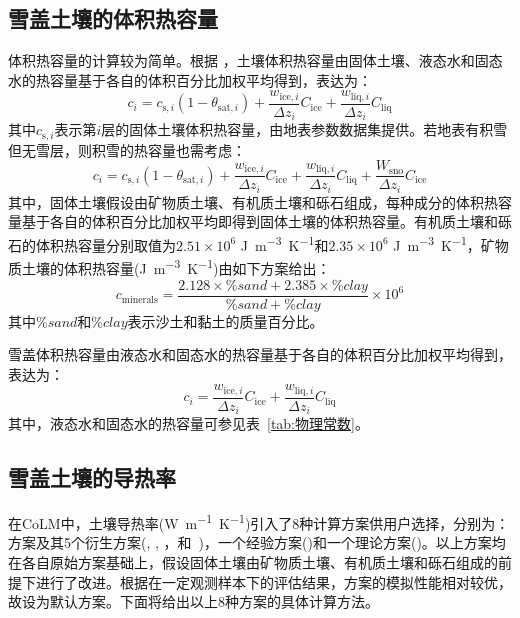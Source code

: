 \subsection{雪盖土壤的体积热容量}

体积热容量的计算较为简单。根据 \citet{de1963thermal}，土壤体积热容量由固体土壤、液态水和固态水的热容量基于各自的体积百分比加权平均得到，表达为：
\begin{equation}
  c_{i}=c_{\mathrm{s},i}\left(1-\theta_{\mathrm {sat},i}\right)+\frac{w_{\mathrm{ice},i}}{\Delta z_{i}} C_{\mathrm{ice}}+\frac{w_{\mathrm{liq},i}}{\Delta z_{i}} C_{\mathrm{liq}}
\end{equation}
其中$c_{\mathrm{s},i}$表示第$i$层的固体土壤体积热容量，由地表参数数据集提供。若地表有积雪但无雪层，则积雪的热容量也需考虑：
\begin{equation}
  c_{i}=c_{\mathrm{s},i}\left(1-\theta_{\mathrm {sat},i}\right)+\frac{w_{\mathrm{ice},i}}{\Delta z_{i}} C_{\mathrm{ice}}+\frac{w_{\mathrm{liq},i}}{\Delta z_{i}} C_{\mathrm{liq}}+\frac{W_{\mathrm{sno}}}{\Delta z_{i}} C_{\mathrm{ice}}
\end{equation}
其中，固体土壤假设由矿物质土壤、有机质土壤和砾石组成，每种成分的体积热容量基于各自的体积百分比加权平均即得到固体土壤的体积热容量。有机质土壤和砾石的体积热容量分别取值为$2.51\times 10^6$ \unit{J.m^{-3}.K^{-1}}和$2.35\times 10^6$ \unit{J.m^{-3}.K^{-1}}，矿物质土壤的体积热容量(\unit{J.m^{-3}.K^{-1}})由如下方案给出：$$c_{\mathrm{minerals}}=\frac{2.128\times\%sand+2.385\times\%clay}{\%sand+\%clay}\times10^6$$
其中$\%sand$和$\%clay$表示沙土和黏土的质量百分比。

雪盖体积热容量由液态水和固态水的热容量基于各自的体积百分比加权平均得到，表达为：
\begin{equation}
  c_{i}=\frac{w_{\mathrm{ice},i}}{\Delta z_{i}} C_{\mathrm{ice}}+\frac{w_{\mathrm{liq},i}}{\Delta z_{i}} C_{\mathrm{liq}}
\end{equation}
其中，液态水和固态水的热容量可参见表~\ref{tab:物理常数}。

\subsection{雪盖土壤的导热率}

在CoLM中，土壤导热率(\unit{W.m^{-1}.K^{-1}})引入了8种计算方案供用户选择，分别为：\citet{Johansen1975}方案及其5个衍生方案(\citet{farouki1981thermal}, \citet{cote2005}, \citet{balland2005}，\citet{lu2007improved}和~\citet{Yan2019thermal})，一个经验方案(\citet{tarnawski2012series})和一个理论方案(\citet{de1963thermal})。以上方案均在各自原始方案基础上，假设固体土壤由矿物质土壤、有机质土壤和砾石组成的前提下进行了改进。根据\citep{dai2019evaluation}在一定观测样本下的评估结果，\citet{balland2005}方案的模拟性能相对较优，故设为默认方案。下面将给出以上8种方案的具体计算方法。

